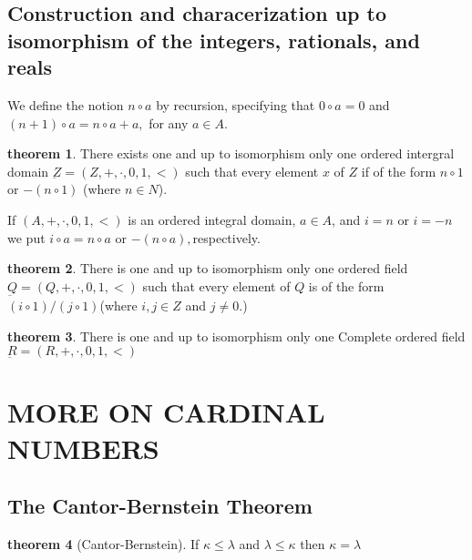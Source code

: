\documentclass[a4paper,11pt]{article}%
\theoremstyle{remark}
\theoremstyle{definition}
\newtheorem{theorem}{theorem}[section]
\theoremstyle{definition}
\theoremstyle{plain}
\theoremstyle{definition}
\begin{document}
\subsection{Construction and characerization up to isomorphism of the integers, rationals, and reals}
We define the notion $n\circ a$ by recursion, specifying that $0\circ a=0$ and $(n+1)\circ a=n\circ a+a, $ for any $a\in A$. 
\begin{theorem}
    There exists one and up to isomorphism only one ordered intergral domain $\underbar{Z}=(Z,+,\cdot,0,1,<)$
    such that every element $x$ of $Z$ if of the form $n\circ 1$ or $-(n\circ 1)$ (where $n\in N$).
\end{theorem}
If $(A,+,\cdot,0,1,<)$ is an ordered integral domain, $a\in A$, and $i=n$ or $i=-n$ we put $i\circ a=n\circ a$
or $-(n\circ a),$respectively.
\begin{theorem}
    There is one and up to isomorphism only one ordered field $\underbar{Q}=(Q,+,\cdot,0,1,<)$ such that 
    every element of $Q$ is of the form $(i\circ 1)/(j\circ 1)$(where $i,j\in Z$ and $j\neq 0.$) 
\end{theorem}
\begin{theorem}
    There is one and up to isomorphism only one Complete ordered field $\underbar{R}=(R,+,\cdot, 0,1,<)$
\end{theorem}
\section{MORE ON CARDINAL NUMBERS}
\subsection{The Cantor-Bernstein Theorem}
\begin{theorem}[Cantor-Bernstein]
   If $\kappa\leq\lambda$ and $\lambda\leq\kappa$ then $\kappa=\lambda$ 
\end{theorem}
\end{document}
